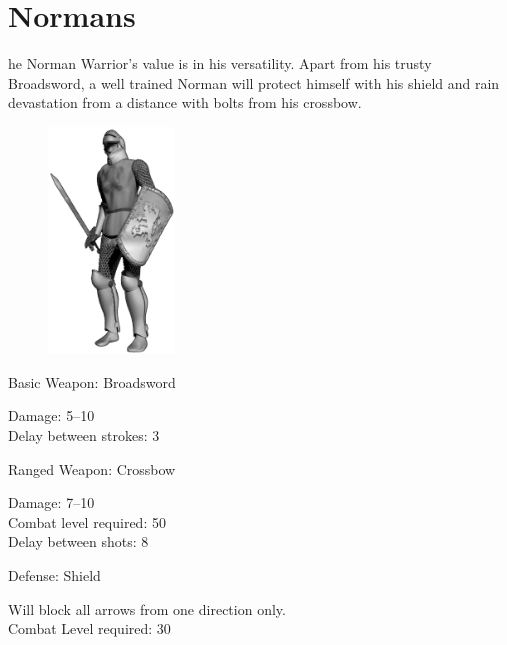\clearpage

\section{Normans}


he Norman Warrior’s value is in his versatility. Apart from his trusty Broadsword, a well trained Norman will protect himself with his shield and rain devastation from a distance with bolts from his crossbow.

\begin{figure}
	\begin{center}
		\vspace{-20pt}
		\includegraphics[width=0.3\textwidth]{Anorman}
	\end{center}
	\vspace{-20pt}
\end{figure}

Basic Weapon: Broadsword
\begin{adjustwidth}{1cm}{}
	Damage: 5–10 \\
	Delay between strokes: 3
\end{adjustwidth}
Ranged Weapon: Crossbow
\begin{adjustwidth}{1cm}{}
	Damage: 7–10 \\
	Combat level required: 50 \\
	Delay between shots: 8
\end{adjustwidth}
Defense: Shield
\begin{adjustwidth}{1cm}{}
	Will block all arrows from one direction only. \\
	Combat Level required: 30 \\ \\ \\
\end{adjustwidth}

